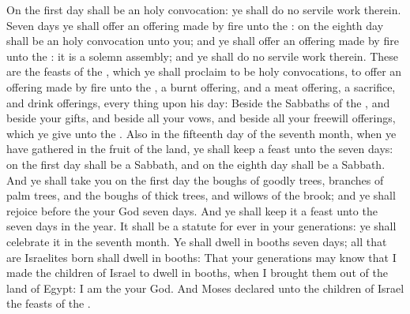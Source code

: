\begin{biblechapter}
\verse On the first day shall be an holy convocation: ye shall do no servile work therein.
\verse Seven days ye shall offer an offering made by fire unto the \LORD: on the eighth day shall be an holy convocation unto you; and ye shall offer an offering made by fire unto the \LORD: it is a solemn assembly; and ye shall do no servile work therein.
\verse These are the feasts of the \LORD, which ye shall proclaim to be holy convocations, to offer an offering made by fire unto the \LORD, a burnt offering, and a meat offering, a sacrifice, and drink offerings, every thing upon his day:
\verse Beside the Sabbaths of the \LORD, and beside your gifts, and beside all your vows, and beside all your freewill offerings, which ye give unto the \LORD.
\verse Also in the fifteenth day of the seventh month, when ye have gathered in the fruit of the land, ye shall keep a feast unto the \LORD seven days: on the first day shall be a Sabbath, and on the eighth day shall be a Sabbath.
\verse And ye shall take you on the first day the boughs of goodly trees, branches of palm trees, and the boughs of thick trees, and willows of the brook; and ye shall rejoice before the \LORD your God seven days.
\verse And ye shall keep it a feast unto the \LORD seven days in the year. It shall be a statute for ever in your generations: ye shall celebrate it in the seventh month.
\verse Ye shall dwell in booths seven days; all that are Israelites born shall dwell in booths:
\verse That your generations may know that I made the children of Israel to dwell in booths, when I brought them out of the land of Egypt: I am the \LORD your God.
\verse And Moses declared unto the children of Israel the feasts of the \LORD.
\end{biblechapter}

